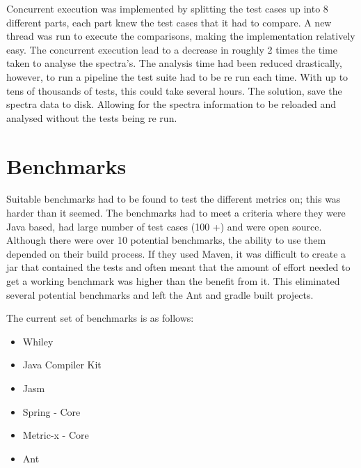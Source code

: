 Concurrent execution was implemented by splitting the test cases up into 8 different parts, each part knew the test cases that it had to compare. A new thread was run to execute the comparisons, making the implementation relatively easy. The concurrent execution lead to a decrease in roughly 2 times the time taken to analyse the spectra's. 
The analysis time had been reduced drastically, however, to run a pipeline the test suite had to be re run each time. With up to tens of thousands of tests, this could take several hours. The solution, save the spectra data to disk. Allowing for the spectra information to be reloaded and analysed without the tests being re run.

\section{Benchmarks}
\label{S:bench}
Suitable benchmarks had to be found to test the different metrics on; this was harder than it seemed. The benchmarks had to meet a criteria where they were Java based, had large number of test cases (100 +) and were open source. Although there were over 10 potential benchmarks, the ability to use them depended on their build process. If they used Maven, it was difficult to create a jar that contained the tests and often meant that the amount of effort needed to get a working benchmark was higher than the benefit from it. This eliminated several potential benchmarks and left the Ant and gradle built projects. 

The current set of benchmarks is as follows:

\begin{itemize}
\item Whiley
\item Java Compiler Kit
\item Jasm
\item Spring - Core
\item Metric-x - Core
\item Ant
\end{itemize}